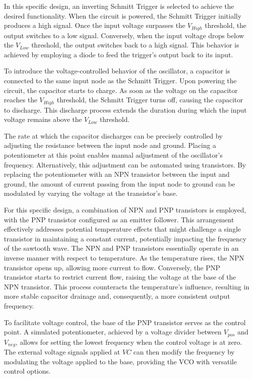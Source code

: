 \documentclass{article}
\begin{document}
In this specific design, an inverting Schmitt Trigger is selected to achieve the desired functionality. When the circuit is powered, the Schmitt Trigger initially produces a high signal. Once the input voltage surpasses the $V_{High}$ threshold, the output switches to a low signal. Conversely, when the input voltage drops below the $V_{Low}$ threshold, the output switches back to a high signal. This behavior is achieved by employing a diode to feed the trigger's output back to its input.

To introduce the voltage-controlled behavior of the oscillator, a capacitor is connected to the same input node as the Schmitt Trigger. Upon powering the circuit, the capacitor starts to charge. As soon as the voltage on the capacitor reaches the $V_{High}$ threshold, the Schmitt Trigger turns off, causing the capacitor to discharge. This discharge process extends the duration during which the input voltage remains above the $V_{Low}$ threshold.

The rate at which the capacitor discharges can be precisely controlled by adjusting the resistance between the input node and ground. Placing a potentiometer at this point enables manual adjustment of the oscillator's frequency. Alternatively, this adjustment can be automated using transistors. By replacing the potentiometer with an NPN transistor between the input and ground, the amount of current passing from the input node to ground can be modulated by varying the voltage at the transistor's base.

For this specific design, a combination of NPN and PNP transistors is employed, with the PNP transistor configured as an emitter follower. This arrangement effectively addresses potential temperature effects that might challenge a single transistor in maintaining a constant current, potentially impacting the frequency of the sawtooth wave. The NPN and PNP transistors essentially operate in an inverse manner with respect to temperature. As the temperature rises, the NPN transistor opens up, allowing more current to flow. Conversely, the PNP transistor starts to restrict current flow, raising the voltage at the base of the NPN transistor. This process counteracts the temperature's influence, resulting in more stable capacitor drainage and, consequently, a more consistent output frequency.

To facilitate voltage control, the base of the PNP transistor serves as the control point. A simulated potentiometer, achieved by a voltage divider between $V_{pos}$ and $V_{neg}$, allows for setting the lowest frequency when the control voltage is at zero. The external voltage signals applied at $VC$ can then modify the frequency by modulating the voltage applied to the base, providing the VCO with versatile control options.
\end{document}
